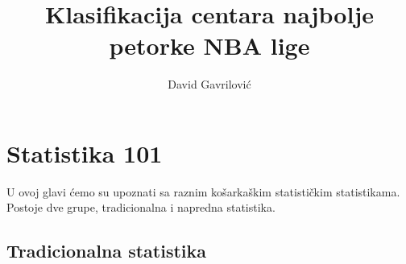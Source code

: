 \documentclass[a4paper]{article}
\begin{document}
\title{Klasifikacija centara najbolje petorke NBA lige}
\author{David Gavrilović}
\maketitle
\thispagestyle{empty}

\newpage

\tableofcontents
\thispagestyle{empty}

\newpage

\section{Statistika 101}
\label{sec:stats_101}

U ovoj glavi ćemo su upoznati sa raznim košarkaškim statističkim statistikama. Postoje dve grupe, tradicionalna i napredna statistika.

\subsection{Tradicionalna statistika}
\label{subsec:trad_stat}
\end{document}

